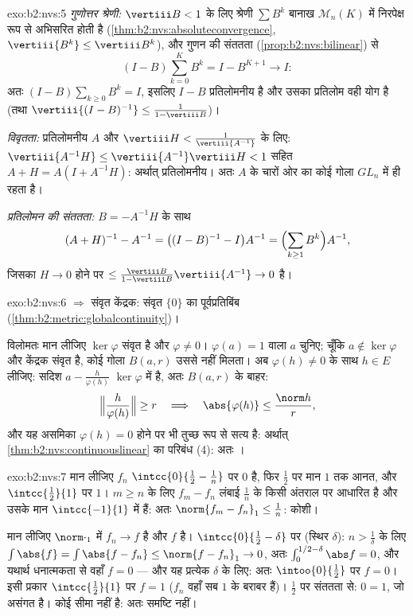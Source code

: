 \begin{solution}{exo:b2:nvs:5}
\emph{गुणोत्तर श्रेणी:} $\vertiii B < 1$ के लिए श्रेणी $\sum
B^k$ बानाख $\mathcal{M}_n(K)$ में निरपेक्ष
रूप से अभिसरित होती है (\cref{thm:b2:nvs:absoluteconvergence}, $\vertiii{B^k} \leq
\vertiii B^k$), और गुणन की संततता (\cref{prop:b2:nvs:bilinear}) से
\[
(I - B)\sum_{k=0}^{K} B^k = I - B^{K+1} \longrightarrow I :
\]
अतः $(I - B)\sum_{k\geq0} B^k = I$, इसलिए $I - B$ प्रतिलोमनीय है और उसका प्रतिलोम वही योग है (तथा
$\vertiii{(I-B)^{-1}} \leq \frac{1}{1 - \vertiii B}$)।

\emph{विवृतता:} प्रतिलोमनीय $A$ और $\vertiii H <
\frac{1}{\vertiii{A^{-1}}}$ के लिए: $\vertiii{A^{-1}H} \leq \vertiii{A^{-1}}\vertiii H < 1$ सहित $A + H = A(I + A^{-1}H)$: अर्थात्
प्रतिलोमनीय। अतः $A$ के चारों ओर का कोई गोला $GL_n$ में ही रहता है।

\emph{प्रतिलोमन की संततता:} $B = -A^{-1}H$ के साथ
\[
(A + H)^{-1} - A^{-1} = \bigl((I - B)^{-1} - I\bigr)A^{-1}
= \Bigl(\sum_{k \geq 1} B^k\Bigr) A^{-1},
\]
जिसका  $H \to 0$ होने पर $\leq \frac{\vertiii B}{1 - \vertiii B}\vertiii{A^{-1}}
\to 0$ है।
\end{solution}

\begin{solution}{exo:b2:nvs:6}
 $\Rightarrow$ संवृत केंद्रक: संवृत $\{0\}$ का पूर्वप्रतिबिंब (\cref{thm:b2:metric:globalcontinuity})।

विलोमतः मान लीजिए $\ker\varphi$ संवृत है और $\varphi \neq 0$। $\varphi(a) = 1$ वाला $a$ चुनिए; चूँकि $a \notin \ker\varphi$
और केंद्रक संवृत है, कोई गोला $B(a, r)$ उससे नहीं मिलता। अब $\varphi(h) \neq 0$ के साथ $h \in E$
लीजिए: सदिश $a - \frac{h}{\varphi(h)}$ $\ker\varphi$ में है, अतः $B(a, r)$ के बाहर:
\[
\Bigl\Vert \frac{h}{\varphi(h)} \Bigr\Vert \geq r
\quad\Longrightarrow\quad
\abs{\varphi(h)} \leq \frac{\norm h}{r},
\]
और यह असमिका $\varphi(h) = 0$ होने पर भी तुच्छ रूप से सत्य है: अर्थात् \cref{thm:b2:nvs:continuouslinear} का
परिबंध (4): अतः ।
\end{solution}

\begin{solution}{exo:b2:nvs:7}
मान लीजिए $f_n$ $\intcc{0}{\frac12 - \frac1n}$ पर $0$ है, फिर $\frac12$ पर मान $1$ तक आनत, और $\intcc{\frac12}{1}$ पर $1$।
$m
\geq n$ के लिए $f_m - f_n$ लंबाई $\frac1n$ के किसी अंतराल पर आधारित है और उसके मान $\intcc{-1}{1}$
में हैं: अतः $\norm{f_m - f_n}_1 \leq
\frac1n$: कोशी।

मान लीजिए $\norm\cdot_1$ में $f_n \to f$ है और $f$  है। $\intcc{0}{\frac12 - \delta}$ पर (स्थिर $\delta$): $n >
\frac1\delta$ के
लिए $\int \abs{f} =
\int\abs{f - f_n} \leq \norm{f - f_n}_1 \to 0$, अतः $\int_0^{1/2 - \delta}\abs f = 0$, और यथार्थ धनात्मकता से वहाँ $f = 0$ --- और यह प्रत्येक
$\delta$ के लिए: अतः $\intoo{0}{\frac12}$ पर $f = 0$। इसी प्रकार $\intcc{\frac12}{1}$ पर $f = 1$ ($f_n$ वहाँ सब
$1$ के बराबर हैं)। $\frac12$ पर संततता से: $0 =
1$, जो असंगत है। कोई सीमा नहीं
है: अतः समष्टि  नहीं।
\end{solution}

